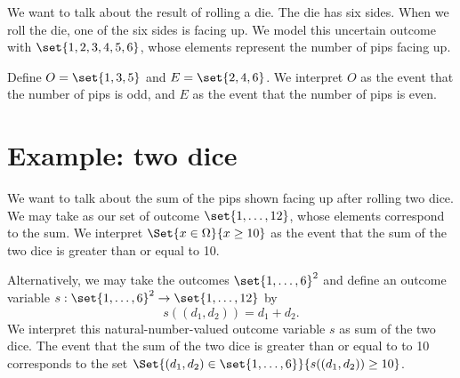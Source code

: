 We want to talk about the result of rolling a die.
The die has six sides.
When we roll the die, one of the six sides is facing up.
We model this uncertain outcome with $\set{1, 2, 3, 4, 5, 6}$, whose elements represent the number of pips facing up.

Define $O = \set{1, 3, 5}$ and $E = \set{2, 4, 6}$.
We interpret $O$ as the event that the number of pips is odd, and $E$ as the event that the number of pips is even.

\section*{Example: two dice}

We want to talk about the sum of the pips shown facing up after rolling two dice.
We may take as our set of outcome $\set{1, \dots , 12}$, whose elements correspond to the sum.
We interpret $\Set{x \in \Omega }{x \geq 10}$ as the event that the sum of the two dice is greater than or equal to 10.

Alternatively, we may take the outcomes $\set{1, \dots , 6}^2$ and define an outcome variable $s: \set{1, \dots , 6}^2 \to \set{1, \dots , 12}$ by
    \[
s((d_1, d_2)) = d_1 + d_2.
    \]
We interpret this natural-number-valued outcome variable $s$ as sum of the two dice.
The event that the sum of the two dice is greater than or equal to to 10 corresponds to the set $\Set{(d_1, d_2) \in \set{1, \dots , 6}}{s((d_1, d_2)) \geq 10}$.
